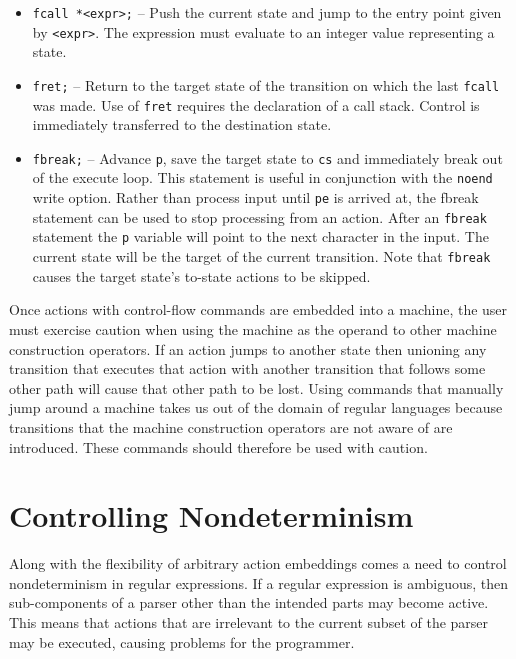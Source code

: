 \documentclass[letterpaper,11pt,oneside]{book}
\begin{document}
\begin{itemize}
\item \verb|fcall *<expr>;| -- Push the current state and jump to the entry
point given by \verb|<expr>|. The expression must evaluate to an integer value
representing a state.

\item \verb|fret;| -- Return to the target state of the transition on which the
last \verb|fcall| was made.  Use of \verb|fret| requires the declaration of a
call stack. Control is immediately transferred to the destination state.

\item \verb|fbreak;| -- Advance \verb|p|, save the target state to \verb|cs|
and immediately break out of the execute loop. This statement is useful
in conjunction with the \verb|noend| write option. Rather than process input
until \verb|pe| is arrived at, the fbreak statement
can be used to stop processing from an action.  After an \verb|fbreak|
statement the \verb|p| variable will point to the next character in the input. The
current state will be the target of the current transition. Note that \verb|fbreak|
causes the target state's to-state actions to be skipped.

\end{itemize}

Once actions with control-flow commands are embedded into a
machine, the user must exercise caution when using the machine as the operand
to other machine construction operators. If an action jumps to another state
then unioning any transition that executes that action with another transition
that follows some other path will cause that other path to be lost. Using
commands that manually jump around a machine takes us out of the domain of
regular languages because transitions that the
machine construction operators are not aware of are introduced.  These
commands should therefore be used with caution.


\chapter{Controlling Nondeterminism}
\label{controlling-nondeterminism}

Along with the flexibility of arbitrary action embeddings comes a need to
control nondeterminism in regular expressions. If a regular expression is
ambiguous, then sub-components of a parser other than the intended parts may become
active. This means that actions that are irrelevant to the
current subset of the parser may be executed, causing problems for the
programmer.
\end{document}
